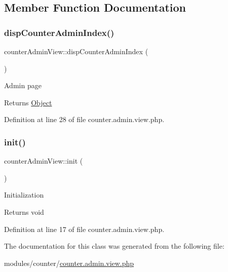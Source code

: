 \subsection{Member Function Documentation}
\mbox{\label{classcounterAdminView_a029f646bdb62ed58543428face01dfd9}} 
\subsubsection{\texorpdfstring{disp\+Counter\+Admin\+Index()}{dispCounterAdminIndex()}}
{\footnotesize\ttfamily counter\+Admin\+View\+::disp\+Counter\+Admin\+Index (\begin{DoxyParamCaption}{ }\end{DoxyParamCaption})}

Admin page

\begin{DoxyReturn}{Returns}
\hyperlink{classObject}{Object} 
\end{DoxyReturn}


Definition at line 28 of file counter.\+admin.\+view.\+php.

\mbox{\label{classcounterAdminView_af681921cbd5c264feb82469ae49195af}} 
\subsubsection{\texorpdfstring{init()}{init()}}
{\footnotesize\ttfamily counter\+Admin\+View\+::init (\begin{DoxyParamCaption}{ }\end{DoxyParamCaption})}

Initialization

\begin{DoxyReturn}{Returns}
void 
\end{DoxyReturn}


Definition at line 17 of file counter.\+admin.\+view.\+php.



The documentation for this class was generated from the following file\+:\begin{DoxyCompactItemize}
\item 
modules/counter/\hyperlink{counter_8admin_8view_8php}{counter.\+admin.\+view.\+php}\end{DoxyCompactItemize}
